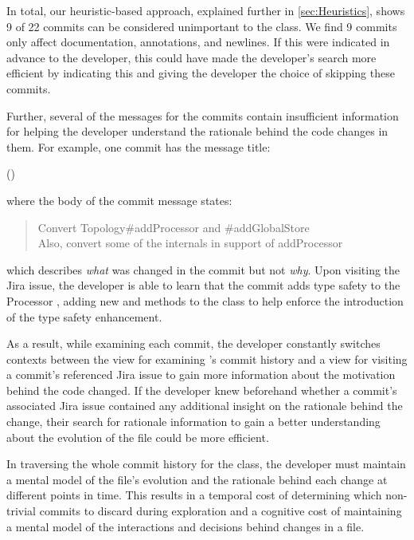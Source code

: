In total, our heuristic-based approach, explained further in \autoref{sec:Heuristics}, 
shows 9 of 22 commits can be considered unimportant to the  class. 
We find 9 commits only affect documentation, annotations, and newlines.
If this were indicated in advance to the developer, this could have made the developer's search more efficient 
by indicating this and giving the developer the choice of skipping these commits.

Further, several of the messages for the commits contain insufficient information
for helping the developer understand the rationale behind the code changes in them.
For example, one commit has the message title:

\begin{center}
	 ()
\end{center}

\noindent where the body of the commit message states:

\begin{quote}
	\textsf{
		Convert Topology\#addProcessor and \#addGlobalStore \\
		Also, convert some of the internals in support of addProcessor
	}
\end{quote}

\noindent which describes \emph{what} was changed in the commit but not \emph{why}.
Upon visiting the Jira issue, the developer is able to learn that
the commit adds type safety to the Processor ,
adding new  and  methods
to the  class to help enforce the introduction of the type safety enhancement.

As a result, while examining each commit, the developer constantly switches contexts between 
the view for examining 's commit history 
and a view for visiting a commit's referenced Jira issue 
to gain more information about the motivation behind the code changed.
If the developer knew beforehand whether a commit's associated Jira issue
contained any additional insight on the rationale behind the change,
their search for rationale information to gain a better understanding
about the evolution of the file could be more efficient.

In traversing the whole commit history for the  class,
the developer must maintain a mental model of the file's evolution 
and the rationale behind each change at different points in time. 
This results in a temporal cost of determining which non-trivial commits to discard during exploration 
and a cognitive cost of maintaining a mental model of the interactions and decisions behind changes in a file.

